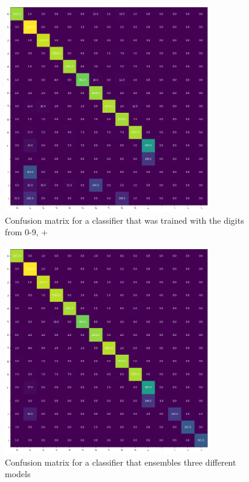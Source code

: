 \documentclass[12pt]{article}
\begin{document}
	\begin{figure}[H]
		\includegraphics[width=0.8\textwidth]{ImagesForReport/confusion_matrix_single.png}
		\caption{Confusion matrix for a classifier that was trained with the digits from 0-9, +}
		\label{fig:mat-single}
	\end{figure}
	
	\begin{figure}[H]
		\includegraphics[width=0.8\textwidth]{ImagesForReport/confusion_matrix_ensemble.png}
		\caption{Confusion matrix for a classifier that ensembles three different models}
		\label{fig:mat-ensemble}
	\end{figure}
	
\end{document}
